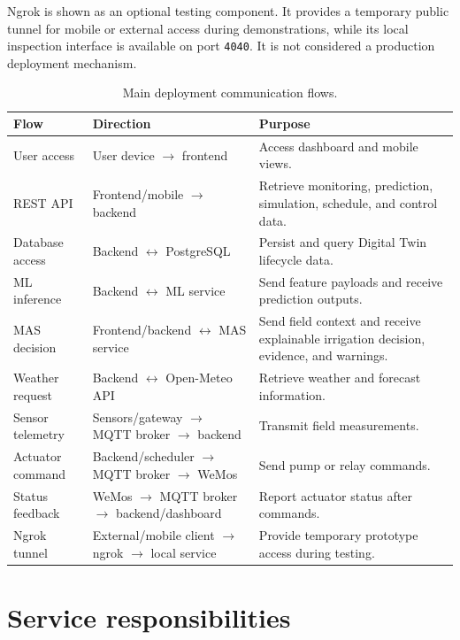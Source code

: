 Ngrok is shown as an optional testing component. It provides a temporary public tunnel for mobile or external access during demonstrations, while its local inspection interface is available on port \texttt{4040}. It is not considered a production deployment mechanism.

\begin{table}[H]
\centering
\small
\caption{Main deployment communication flows.}
\label{tab:deployment_communication_flows}
\begin{tabular}{p{}p{}p{}}
\hline
\textbf{Flow} & \textbf{Direction} & \textbf{Purpose} \\
\hline
User access & User device $\rightarrow$ frontend & Access dashboard and mobile views. \\
REST API & Frontend/mobile $\rightarrow$ backend & Retrieve monitoring, prediction, simulation, schedule, and control data. \\
Database access & Backend $\leftrightarrow$ PostgreSQL & Persist and query Digital Twin lifecycle data. \\
ML inference & Backend $\leftrightarrow$ ML service & Send feature payloads and receive prediction outputs. \\
MAS decision & Frontend/backend $\leftrightarrow$ MAS service & Send field context and receive explainable irrigation decision, evidence, and warnings. \\
Weather request & Backend $\leftrightarrow$ Open-Meteo API & Retrieve weather and forecast information. \\
Sensor telemetry & Sensors/gateway $\rightarrow$ MQTT broker $\rightarrow$ backend & Transmit field measurements. \\
Actuator command & Backend/scheduler $\rightarrow$ MQTT broker $\rightarrow$ WeMos & Send pump or relay commands. \\
Status feedback & WeMos $\rightarrow$ MQTT broker $\rightarrow$ backend/dashboard & Report actuator status after commands. \\
Ngrok tunnel & External/mobile client $\rightarrow$ ngrok $\rightarrow$ local service & Provide temporary prototype access during testing. \\
\hline
\end{tabular}
\end{table}

\section{Service responsibilities}

